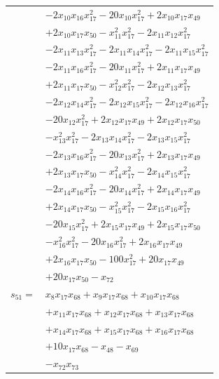 \begin{longtable}{@{}r@{\;}l@{}}
 & \(\displaystyle -2x_{10}x_{16}x_{17}^{2} -20x_{10}x_{17}^{2} +2x_{10}x_{17}x_{49}\) \\
 & \(\displaystyle +2x_{10}x_{17}x_{50} -x_{11}^{2}x_{17}^{2} -2x_{11}x_{12}x_{17}^{2}\) \\
 & \(\displaystyle -2x_{11}x_{13}x_{17}^{2} -2x_{11}x_{14}x_{17}^{2} -2x_{11}x_{15}x_{17}^{2}\) \\
 & \(\displaystyle -2x_{11}x_{16}x_{17}^{2} -20x_{11}x_{17}^{2} +2x_{11}x_{17}x_{49}\) \\
 & \(\displaystyle +2x_{11}x_{17}x_{50} -x_{12}^{2}x_{17}^{2} -2x_{12}x_{13}x_{17}^{2}\) \\
 & \(\displaystyle -2x_{12}x_{14}x_{17}^{2} -2x_{12}x_{15}x_{17}^{2} -2x_{12}x_{16}x_{17}^{2}\) \\
 & \(\displaystyle -20x_{12}x_{17}^{2} +2x_{12}x_{17}x_{49} +2x_{12}x_{17}x_{50}\) \\
 & \(\displaystyle -x_{13}^{2}x_{17}^{2} -2x_{13}x_{14}x_{17}^{2} -2x_{13}x_{15}x_{17}^{2}\) \\
 & \(\displaystyle -2x_{13}x_{16}x_{17}^{2} -20x_{13}x_{17}^{2} +2x_{13}x_{17}x_{49}\) \\
 & \(\displaystyle +2x_{13}x_{17}x_{50} -x_{14}^{2}x_{17}^{2} -2x_{14}x_{15}x_{17}^{2}\) \\
 & \(\displaystyle -2x_{14}x_{16}x_{17}^{2} -20x_{14}x_{17}^{2} +2x_{14}x_{17}x_{49}\) \\
 & \(\displaystyle +2x_{14}x_{17}x_{50} -x_{15}^{2}x_{17}^{2} -2x_{15}x_{16}x_{17}^{2}\) \\
 & \(\displaystyle -20x_{15}x_{17}^{2} +2x_{15}x_{17}x_{49} +2x_{15}x_{17}x_{50}\) \\
 & \(\displaystyle -x_{16}^{2}x_{17}^{2} -20x_{16}x_{17}^{2} +2x_{16}x_{17}x_{49}\) \\
 & \(\displaystyle +2x_{16}x_{17}x_{50} -100x_{17}^{2} +20x_{17}x_{49}\) \\
 & \(\displaystyle +20x_{17}x_{50} -x_{72}\) \\[3pt]
\(s_{51}=\) & \(\displaystyle x_{8}x_{17}x_{68} +x_{9}x_{17}x_{68} +x_{10}x_{17}x_{68}\) \\
 & \(\displaystyle +x_{11}x_{17}x_{68} +x_{12}x_{17}x_{68} +x_{13}x_{17}x_{68}\) \\
 & \(\displaystyle +x_{14}x_{17}x_{68} +x_{15}x_{17}x_{68} +x_{16}x_{17}x_{68}\) \\
 & \(\displaystyle +10x_{17}x_{68} -x_{48} -x_{69}\) \\
 & \(\displaystyle -x_{72}x_{73}\) \\[3pt]

\end{longtable}
